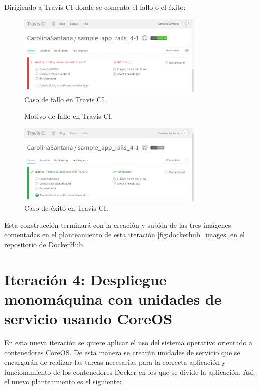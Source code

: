Dirigiendo a Travis CI donde se comenta el fallo o el éxito:

\begin{figure}[H]
\centering
\includegraphics[width=0.8\textwidth]{images/figures/travisfailure2.png}
\caption{Caso de fallo en Travis CI.\label{fig:figure_placement_example}}
\end{figure}

\begin{figure}[H]
\centering
{}
\caption{Motivo de fallo en Travis CI.\label{fig:figure_placement_example}}
\end{figure}

\begin{figure}[H]
\centering
\includegraphics[width=0.8\textwidth]{images/figures/travissuccess2.png}
\caption{Caso de éxito en Travis CI.\label{fig:figure_placement_example}}
\end{figure}

Esta construcción terminará con la creación y subida de las tres imágenes comentadas en el planteamiento de esta iteración \ref{fig:dockerhub_images} en el repositorio de DockerHub.

\section{Iteración 4: Despliegue monomáquina con unidades de servicio usando CoreOS}

En esta nueva iteración se quiere aplicar el uso del sistema operativo orientado a contenedores CoreOS. De esta manera se crearán unidades de servicio  que se encargarán de realizar las tareas necesarias para la correcta aplicación y funcionamiento de los contenedores Docker en los que se divide la aplicación. Así, el nuevo planteamiento es el siguiente:

